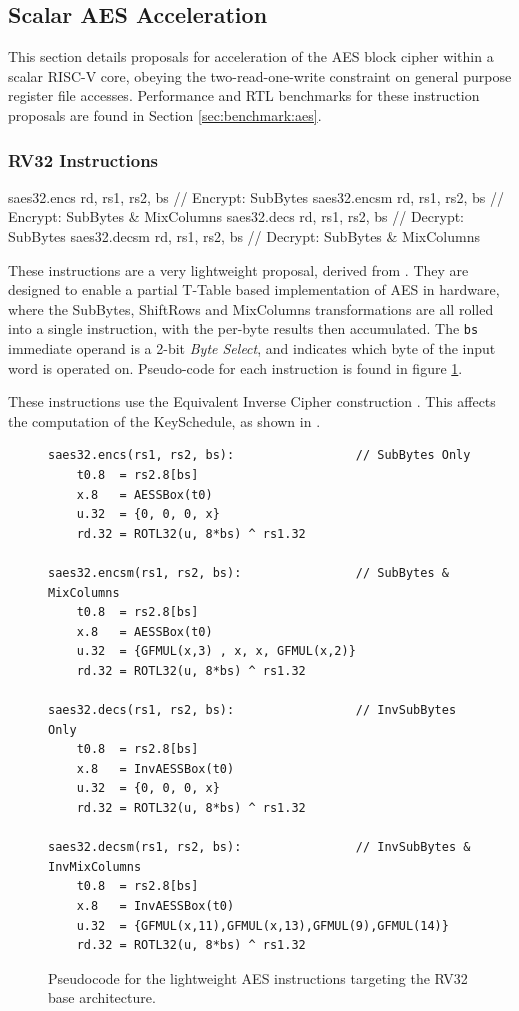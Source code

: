 
\newpage
\subsection{Scalar AES Acceleration}
\label{sec:scalar:aes}

This section details proposals for acceleration of
the AES block cipher \cite{nist:fips:197} within a scalar RISC-V core,
obeying the two-read-one-write constraint on general purpose register
file accesses.
Performance and RTL benchmarks for these
instruction proposals are found in Section
\ref{sec:benchmark:aes}.

\subsubsection{RV32 Instructions}
\label{sec:scalar:aes:rv32}

\begin{cryptoisa}
saes32.encs      rd, rs1, rs2, bs // Encrypt: SubBytes
saes32.encsm     rd, rs1, rs2, bs // Encrypt: SubBytes & MixColumns
saes32.decs      rd, rs1, rs2, bs // Decrypt: SubBytes
saes32.decsm     rd, rs1, rs2, bs // Decrypt: SubBytes & MixColumns
\end{cryptoisa}

These instructions are a very lightweight proposal, derived from
\cite{MJS:LWAES:20}.
They are designed to enable a partial T-Table based implementation
of AES in hardware, where the SubBytes, ShiftRows and MixColumns
transformations are all rolled into a single instruction, with the
per-byte results then accumulated.
The {\tt bs} immediate operand is a 2-bit {\em Byte Select}, and indicates
which byte of the input word is operated on.
Pseudo-code for each instruction is found in figure
\ref{fig:pseudo:aes:rv32}.

These instructions use the Equivalent Inverse Cipher
construction \cite[Section 5.3.5]{nist:fips:197}.
This affects the computation of the KeySchedule, as shown in
\cite[Figure 15]{nist:fips:197}.

\begin{figure}[h]
\begin{lstlisting}[language=pseudo]
saes32.encs(rs1, rs2, bs):                 // SubBytes Only
    t0.8  = rs2.8[bs]
    x.8   = AESSBox(t0)
    u.32  = {0, 0, 0, x}
    rd.32 = ROTL32(u, 8*bs) ^ rs1.32

saes32.encsm(rs1, rs2, bs):                // SubBytes & MixColumns
    t0.8  = rs2.8[bs]
    x.8   = AESSBox(t0)
    u.32  = {GFMUL(x,3) , x, x, GFMUL(x,2)}
    rd.32 = ROTL32(u, 8*bs) ^ rs1.32

saes32.decs(rs1, rs2, bs):                 // InvSubBytes Only
    t0.8  = rs2.8[bs]
    x.8   = InvAESSBox(t0)
    u.32  = {0, 0, 0, x}
    rd.32 = ROTL32(u, 8*bs) ^ rs1.32

saes32.decsm(rs1, rs2, bs):                // InvSubBytes & InvMixColumns
    t0.8  = rs2.8[bs]
    x.8   = InvAESSBox(t0)
    u.32  = {GFMUL(x,11),GFMUL(x,13),GFMUL(9),GFMUL(14)}
    rd.32 = ROTL32(u, 8*bs) ^ rs1.32
\end{lstlisting}
\caption{Pseudocode for the lightweight AES instructions targeting the
RV32 base architecture.}
\label{fig:pseudo:aes:rv32}
\end{figure}

